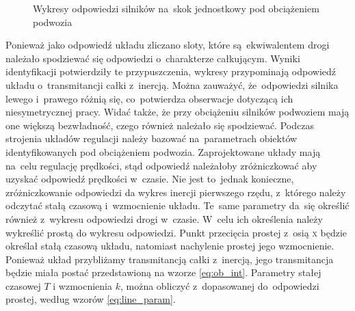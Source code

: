 \documentclass[11pt]{article}
\begin{document}
\begin{figure}[!htbp] 
	\quad 
	\caption{Wykresy odpowiedzi silników na~skok jednostkowy pod obciążeniem podwozia} 
\end{figure}

Ponieważ jako odpowiedź układu zliczano sloty, które są~ekwiwalentem drogi należało spodziewać się odpowiedzi o~charakterze całkującym.
Wyniki identyfikacji potwierdziły te przypuszczenia, wykresy przypominają odpowiedź układu o~transmitancji całki z~inercją.
Można zauważyć, że~odpowiedzi silnika lewego i~prawego różnią się, co~potwierdza obserwacje dotyczącą ich niesymetrycznej pracy.
Widać także, że przy obciążeniu silników podwoziem mają one większą bezwładność, czego również należało się spodziewać.
Podczas strojenia układów regulacji należy bazować na~parametrach obiektów identyfikowanych pod obciążeniem podwozia.
Zaprojektowane układy mają na~celu regulację prędkości, stąd odpowiedź należałoby zróżniczkować aby uzyskać odpowiedź prędkości w~czasie.
Nie jest to~jednak konieczne, zróżniczkowanie odpowiedzi da wykres inercji pierwszego rzędu, z~którego należy odczytać stałą czasową i~wzmocnienie układu.
Te~same parametry da~się określić również z~wykresu odpowiedzi drogi w~czasie.
W~celu ich określenia należy wykreślić prostą do wykresu odpowiedzi.
Punkt przecięcia prostej z~osią \textsc{x} będzie określał stałą czasową układu, natomiast nachylenie prostej jego wzmocnienie.
Ponieważ układ przybliżamy transmitancją całki z~inercją, jego transmitancja będzie miała postać przedstawioną na wzorze \ref{eq:ob_int}.
Parametry stałej czasowej $ T $ i wzmocnienia $ k $, można obliczyć z~dopasowanej do~odpowiedzi prostej, według wzorów \ref{eq:line_param}.
\end{document}
